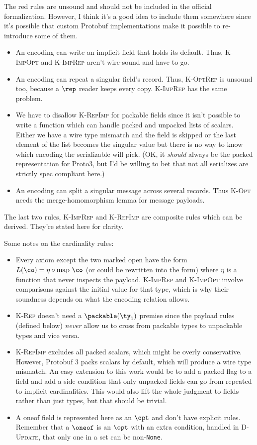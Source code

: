 The red rules are unsound and should not be included in the official
formalization. However, I think it's a good idea to include them somewhere since
it's possible that custom Protobuf implementations make it possible to
re-introduce some of them.
\begin{itemize}
\item An encoding can write an implicit field that holds its default. Thus,
  \textsc{K-ImpOpt} and \textsc{K-ImpRep} aren't wire-sound and have to go.
\item An encoding can repeat a singular field's record. Thus, \textsc{K-OptRep}
  is unsound too, because a $\rep$ reader keeps every copy. \textsc{K-ImpRep}
  has the same problem.
\item We have to disallow \textsc{K-RepImp} for packable fields since it isn't
  possible to write a function which can handle packed and unpacked lists of
  scalars. Either we have a wire type mismatch and the field is skipped or the
  last element of the list becomes the singular value but there is no way to
  know which encoding the serializable will pick. (OK, it \emph{should} always
  be the packed representation for Proto3, but I'd be willing to bet that not
  all serializes are strictly spec compliant here.)
\item An encoding can split a singular message across several records. Thus
  \textsc{K-Opt} needs the merge-homomorphism lemma for message payloads.
\end{itemize}

The last two rules, \textsc{K-ImpRep} and \textsc{K-RepImp} are composite rules
which can be derived. They're stated here for clarity.

Some notes on the cardinality rules:
\begin{itemize}
\item Every axiom except the two marked open have the form
  $L(\co) = \eta \circ \mathrm{map}\ \co$ (or could be rewritten into the form) where
  $\eta$ is a function that never inspects the payload. \textsc{K-ImpRep} and
  \textsc{K-ImpOpt} involve comparisons against the initial value for that type,
  which is why their soundness depends on what the encoding relation allows.
\item \textsc{K-Rep} doesn't need a $\packable(\ty_1)$ premise since the payload
  rules (defined below) \emph{never} allow us to cross from packable types to
  unpackable types and vice versa.
\item \textsc{K-RepImp} excludes all packed scalars, which might be overly
  conservative. However, Protobuf 3 packs scalars by default, which will produce
  a wire type mismatch. An easy extension to this work would be to add a packed
  flag to a field and add a side condition that only unpacked fields can go from
  repeated to implicit cardinalities. This would also lift the whole judgment to
  fields rather than just types, but that should be trivial.
\item A oneof field is represented here as an $\opt$ and don't have explicit
  rules. Remember that a $\oneof$ is an $\opt$ with an extra condition, handled in
  \textsc{D-Update}, that only one in a set can be non-\texttt{None}.
\end{itemize}

